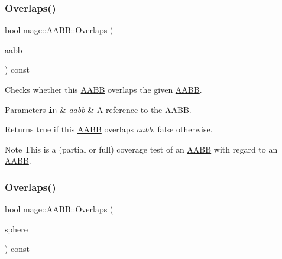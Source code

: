 \subsubsection{\texorpdfstring{Overlaps()}{Overlaps()}\hspace{0.1cm}{\footnotesize\ttfamily [1/2]}}
{\footnotesize\ttfamily bool mage\+::\+A\+A\+B\+B\+::\+Overlaps (\begin{DoxyParamCaption}\item[{const \hyperlink{classmage_1_1_a_a_b_b}{A\+A\+BB} \&}]{aabb }\end{DoxyParamCaption}) const\hspace{0.3cm}{\ttfamily [noexcept]}}

Checks whether this \hyperlink{classmage_1_1_a_a_b_b}{A\+A\+BB} overlaps the given \hyperlink{classmage_1_1_a_a_b_b}{A\+A\+BB}.


\begin{DoxyParams}[1]{Parameters}
\mbox{\tt in}  & {\em aabb} & A reference to the \hyperlink{classmage_1_1_a_a_b_b}{A\+A\+BB}. \\
\hline
\end{DoxyParams}
\begin{DoxyReturn}{Returns}
{\ttfamily true} if this \hyperlink{classmage_1_1_a_a_b_b}{A\+A\+BB} overlaps {\itshape aabb}. {\ttfamily false} otherwise. 
\end{DoxyReturn}
\begin{DoxyNote}{Note}
This is a (partial or full) coverage test of an \hyperlink{classmage_1_1_a_a_b_b}{A\+A\+BB} with regard to an \hyperlink{classmage_1_1_a_a_b_b}{A\+A\+BB}. 
\end{DoxyNote}
\hypertarget{classmage_1_1_a_a_b_b_acd344f81141b5439c3e2cf4321b6548b}{}\label{classmage_1_1_a_a_b_b_acd344f81141b5439c3e2cf4321b6548b} 
\subsubsection{\texorpdfstring{Overlaps()}{Overlaps()}\hspace{0.1cm}{\footnotesize\ttfamily [2/2]}}
{\footnotesize\ttfamily bool mage\+::\+A\+A\+B\+B\+::\+Overlaps (\begin{DoxyParamCaption}\item[{const \hyperlink{classmage_1_1_bounding_sphere}{Bounding\+Sphere} \&}]{sphere }\end{DoxyParamCaption}) const\hspace{0.3cm}{\ttfamily [noexcept]}}

